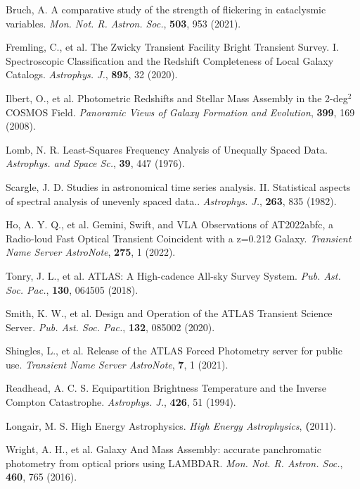 \documentclass{nature_plusfigure}
\newcommand{\mn}{{Mon. Not. R. Astron. Soc.}}
\newcommand{\mnras}{\mn}
\newcommand{\apj}{{Astrophys. J.}}
\newcommand{\apss}{{Astrophys. and Space Sc.}}
\newcommand{\pasp}{{Pub. Ast. Soc. Pac.}}
\begin{document}
\begin{methods}
\begin{thebibliography}{10}
 Bruch, A. A comparative study of the strength of flickering in cataclysmic variables. \emph{\mnras}, \textbf{503}, 953 (2021). 

 Fremling, C., et al. The Zwicky Transient Facility Bright Transient Survey. I. Spectroscopic Classification and the Redshift Completeness of Local Galaxy Catalogs. \emph{\apj}, \textbf{895}, 32 (2020).

 Ilbert, O., et al. Photometric Redshifts and Stellar Mass Assembly in the 2-deg$^2$ COSMOS Field. \emph{Panoramic Views of Galaxy Formation and Evolution}, \textbf{399}, 169 (2008). 


 Lomb, N. R. Least-Squares Frequency Analysis of Unequally Spaced Data. \emph{\apss}, \textbf{39}, 447 (1976). 

 Scargle, J. D. Studies in astronomical time series analysis. II. Statistical aspects of spectral analysis of unevenly spaced data.. \emph{\apj}, \textbf{263}, 835 (1982). 


 Ho, A. Y. Q., et al. Gemini, Swift, and VLA Observations of AT2022abfc, a Radio-loud Fast Optical Transient Coincident with a z=0.212 Galaxy. \emph{Transient Name Server AstroNote}, \textbf{275}, 1 (2022). 

  Tonry, J. L., et al. ATLAS: A High-cadence All-sky Survey System. \emph{\pasp}, \textbf{130}, 064505 (2018). 

 Smith, K. W., et al. Design and Operation of the ATLAS Transient Science Server. \emph{\pasp}, \textbf{132}, 085002 (2020). 

 Shingles, L., et al. Release of the ATLAS Forced Photometry server for public use. \emph{Transient Name Server AstroNote}, \textbf{7}, 1 (2021). 

 Readhead, A. C. S. Equipartition Brightness Temperature and the Inverse Compton Catastrophe. \emph{\apj}, \textbf{426}, 51 (1994). 

  Longair, M. S. High Energy Astrophysics. \emph{High Energy Astrophysics}, \textbf (2011). 
 
 
  Wright, A. H., et al. Galaxy And Mass Assembly: accurate panchromatic photometry from optical priors using LAMBDAR. \emph{\mnras}, \textbf{460}, 765 (2016). 
 

\end{thebibliography}
\end{methods}
\end{document}
